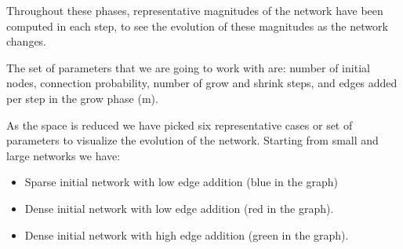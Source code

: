 Throughout these phases, representative magnitudes of the network have been computed in each step, to see the evolution of these magnitudes as the network changes.  

The set of parameters that we are going to work with are: number of initial nodes, connection probability, number of grow and shrink steps, and edges added per step in the grow phase (m).

As the space is reduced we have picked six representative cases or set of parameters to visualize the evolution of the network. Starting from small and large networks we have:

\begin{itemize}
    \item Sparse initial network with low edge addition (blue in the graph)
    \item Dense initial network with low edge addition (red in the graph).
    \item Dense initial network with high edge addition (green in the graph).
\end{itemize}






